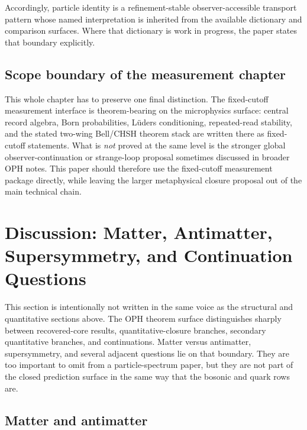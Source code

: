 \documentclass[11pt]{article}
\begin{document}
Accordingly, particle identity is a refinement-stable
observer-accessible transport pattern whose named interpretation is inherited from the
available dictionary and comparison surfaces. Where that dictionary is work in progress, the paper states
that boundary explicitly.

\subsection{Scope boundary of the measurement chapter}

This whole chapter has to preserve one final distinction. The fixed-cutoff measurement interface
is theorem-bearing on the microphysics surface: central record algebra, Born
probabilities, L\"uders conditioning, repeated-read stability, and the stated two-wing
Bell/CHSH theorem stack are written there as fixed-cutoff statements. What is \emph{not} proved
at the same level is the stronger global observer-continuation or strange-loop proposal sometimes
discussed in broader OPH notes. This paper should therefore use the fixed-cutoff measurement
package directly, while leaving the larger metaphysical closure proposal out of the main technical
chain.

\section{Discussion: Matter, Antimatter, Supersymmetry, and Continuation Questions}

This section is intentionally not written in the same voice as the structural and quantitative
sections above. The OPH theorem surface distinguishes sharply between recovered-core
results, quantitative-closure branches, secondary quantitative branches, and continuations. Matter versus
antimatter, supersymmetry, and several adjacent questions lie on that boundary. They are too
important to omit from a particle-spectrum paper, but they are not part of the closed
prediction surface in the same way that the bosonic and quark rows are.

\subsection{Matter and antimatter}
\end{document}
